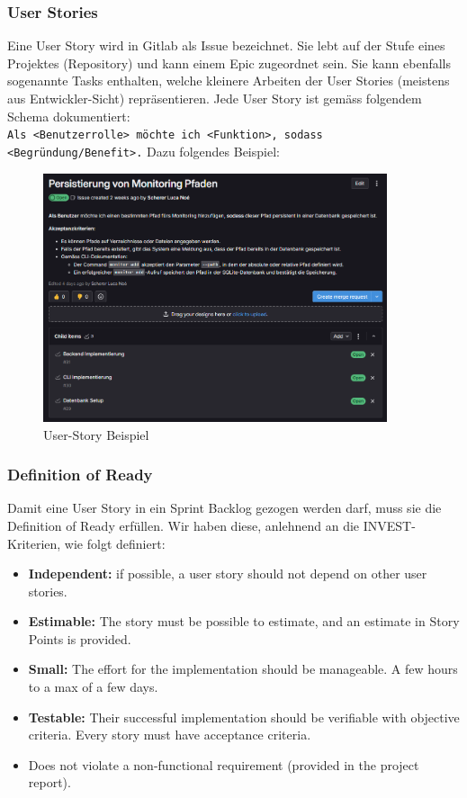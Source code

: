 \documentclass[a4paper,12pt]{report}
\begin{document}
    \clearpage

    \subsubsection{User Stories}
    Eine User Story wird in Gitlab als Issue bezeichnet.
    Sie lebt auf der Stufe eines Projektes (Repository) und kann einem Epic zugeordnet sein.
    Sie kann ebenfalls sogenannte Tasks enthalten, welche kleinere Arbeiten der User Stories (meistens aus Entwickler-Sicht) repräsentieren.
    Jede User Story ist gemäss folgendem Schema dokumentiert:
    \\
    \texttt{Als <Benutzerrolle> möchte ich <Funktion>, sodass <Begründung/Benefit>.}
    Dazu folgendes Beispiel:
    \begin{figure}[h]
        \centering
        \includegraphics[width=0.9\textwidth]{assets/user-story-example}
        \caption{User-Story Beispiel}
        \label{fig:user-story-example}
    \end{figure}

    \subsubsection{Definition of Ready}
    Damit eine User Story in ein Sprint Backlog gezogen werden darf, muss sie die Definition of Ready erfüllen.
    Wir haben diese, anlehnend an die INVEST-Kriterien, wie folgt definiert:
    \begin{itemize}
        \item \textbf{Independent:} if possible, a user story should not depend on other user stories.
        \item \textbf{Estimable:} The story must be possible to estimate, and an estimate in Story Points is provided.
        \item \textbf{Small:} The effort for the implementation should be manageable.
        A few hours to a max of a few days.
        \item \textbf{Testable:} Their successful implementation should be verifiable with objective criteria.
        Every story must have acceptance criteria.
        \item Does not violate a non-functional requirement (provided in the project report).
    \end{itemize}
\end{document}
